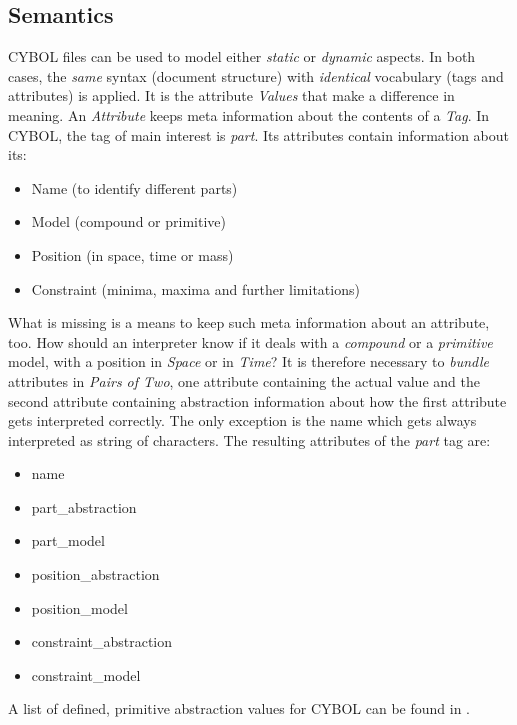 %
%
%
%
%
%
%

\subsection{Semantics}
\label{semantics_heading}

CYBOL files can be used to model either \emph{static} or \emph{dynamic} aspects.
In both cases, the \emph{same} syntax (document structure) with \emph{identical}
vocabulary (tags and attributes) is applied. It is the attribute \emph{Values}
that make a difference in meaning. An \emph{Attribute} keeps meta information
about the contents of a \emph{Tag}. In CYBOL, the tag of main interest is
\emph{part}. Its attributes contain information about its:

\begin{itemize}
    \item{Name (to identify different parts)}
    \item{Model (compound or primitive)}
    \item{Position (in space, time or mass)}
    \item{Constraint (minima, maxima and further limitations)}
\end{itemize}

What is missing is a means to keep such meta information about an attribute,
too. How should an interpreter know if it deals with a \emph{compound} or a
\emph{primitive} model, with a position in \emph{Space} or in \emph{Time}?
It is therefore necessary to \emph{bundle} attributes in \emph{Pairs of Two},
one attribute containing the actual value and the second attribute containing
abstraction information about how the first attribute gets interpreted correctly.
The only exception is the name which gets always interpreted as string of characters.
The resulting attributes of the \emph{part} tag are:

\begin{itemize}
    \item{name}
    \item{part\_abstraction}
    \item{part\_model}
    \item{position\_abstraction}
    \item{position\_model}
    \item{constraint\_abstraction}
    \item{constraint\_model}
\end{itemize}

A list of defined, primitive abstraction values for CYBOL can be found in \cite{cybop}.

